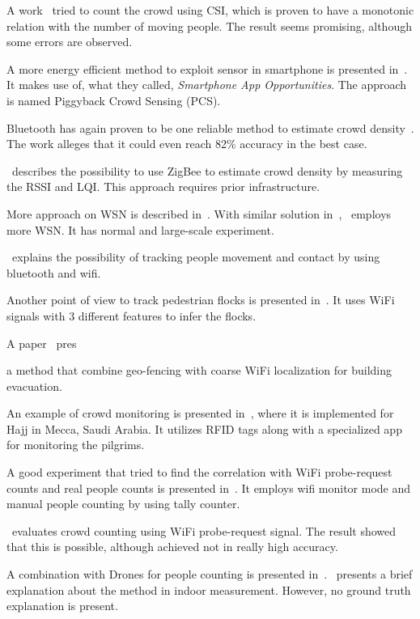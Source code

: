 \documentclass{article}
\begin{document}
A work~\cite{thesis006} tried to count the crowd using CSI, which is proven to have a monotonic relation with the number of moving people. The result seems promising, although some errors are observed.

A more energy efficient method to exploit sensor in smartphone is presented in~\cite{thesis040}. It makes use of, what they called, \textit{Smartphone App Opportunities}. The approach is named Piggyback Crowd Sensing (PCS).

Bluetooth has again proven to be one reliable method to estimate crowd density~\cite{thesis041}. The work alleges that it could even reach 82\% accuracy in the best case.

\cite{thesis042}~describes the possibility to use ZigBee to estimate crowd density by measuring the RSSI and LQI. This approach requires prior infrastructure.

More approach on WSN is described in~\cite{thesis043}. With similar solution in~\cite{thesis042},~\cite{thesis043} employs more WSN. It has normal and large-scale experiment.

\cite{thesis022}~explains the possibility of tracking people movement and contact by using bluetooth and wifi.

Another point of view to track pedestrian flocks is presented in~\cite{thesis033}. It uses WiFi signals with 3 different features to infer the flocks.

A paper~\cite{thesis045} pres

\cite{thesis053} a method that combine geo-fencing with coarse WiFi localization for building evacuation.

An example of crowd monitoring is presented in~\cite{thesis050}, where it is implemented for Hajj in Mecca, Saudi Arabia. It utilizes RFID tags along with a specialized app for monitoring the pilgrims.

A good experiment that tried to find the correlation with WiFi probe-request counts and real people counts is presented in~\cite{thesis047}. It employs wifi monitor mode and manual people counting by using tally counter.

\cite{thesis057}~evaluates crowd counting using WiFi probe-request signal. The result showed that this is possible, although achieved not in really high accuracy.

A combination with Drones for people counting is presented in~\cite{thesis053}. \cite{thesis060}~presents a brief explanation about the method in indoor measurement. However, no ground truth explanation is present.
\end{document}
